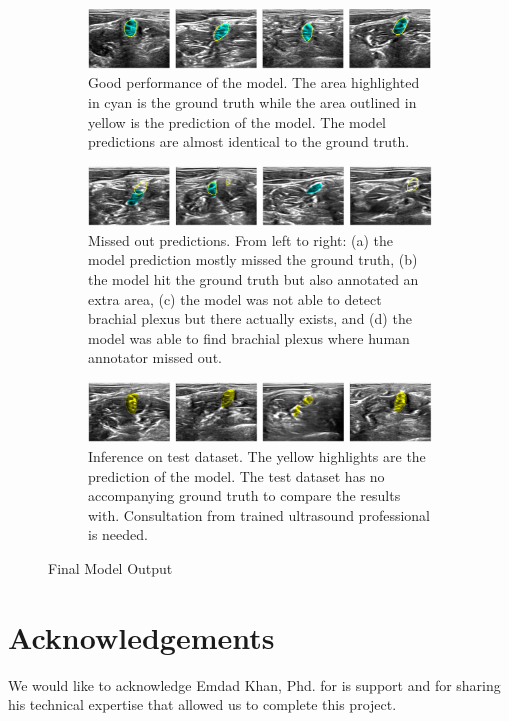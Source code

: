 \documentclass{article}
\begin{document}
\begin{figure}[ht]
    \centering
    \begin{subfigure}[b]{1.0\linewidth}
        \includegraphics[width=1.0\linewidth]{figures/result_1.png}
        \caption{Good performance of the model. The area highlighted in cyan is the ground truth while the area outlined in yellow is the prediction of the model. The model predictions are almost identical to the ground truth.}
        \label{fig:result_1}
    \end{subfigure}
    
    \begin{subfigure}[b]{1.0\linewidth}
        \includegraphics[width=1.0\linewidth]{figures/result_2.png}
        \caption{Missed out predictions. From left to right: (a) the model prediction mostly missed the ground truth, (b) the model hit the ground truth but also annotated an extra area, (c) the model was not able to detect brachial plexus but there actually exists, and (d) the model was able to find brachial plexus where human annotator missed out.}
        \label{fig:result_2}
    \end{subfigure}
    
    \begin{subfigure}[b]{1.0\linewidth}
        \includegraphics[width=1.0\linewidth]{figures/result_3.png}
        \caption{Inference on test dataset. The yellow highlights are the prediction of the model. The test dataset has no accompanying ground truth to compare the results with. Consultation from trained ultrasound professional is needed.}
        \label{fig:result_3}
    \end{subfigure}


    \caption{Final Model Output}
    \label{fig:result}
\end{figure}


\bigskip


\bigskip


\bigskip

\section{Acknowledgements}
We would like to acknowledge Emdad Khan, Phd. for is support and for sharing his technical expertise that allowed us to complete this project. 
\bigskip




\end{document}
